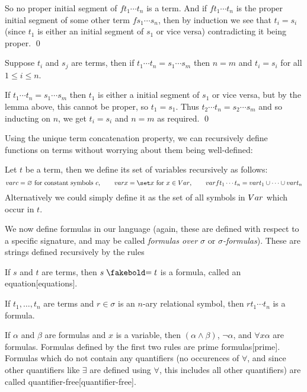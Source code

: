 So no proper initial segment of $ft_1\cdots t_n$ is a term.
And if $ft_1\cdots t_n$ is the proper initial segment of some other term $fs_1\cdots s_n$, then by induction we see that $t_i=s_i$ (since $t_1$ is either an initial segment of $s_1$ or vice versa)
contradicting it being proper.
\qed

\bprop[title=Unique Term Concatenation Property, name=uniquetermcat]

    Suppose $t_i$ and $s_j$ are terms, then if $t_1\cdots t_n=s_1\cdots s_m$ then $n=m$ and $t_i=s_i$ for all $1\leq i\leq n$.

\eprop

If $t_1\cdots t_n=s_1\cdots s_m$ then $t_1$ is either a initial segment of $s_1$ or vice versa, but by the lemma above, this cannot be proper, so $t_1=s_1$.
Thus $t_2\cdots t_n=s_2\cdots s_m$ and so inducting on $n$, we get $t_i=s_i$ and $n=m$ as required.
\qed

Using the unique term concatenation property, we can recursively define functions on terms without worrying about them being well-defined:

\bdefn

    Let $t$ be a term, then we define its {\emphcolor set of variables} recursively as follows:
    $$ \var c=\varnothing\hbox{ for constant symbols $c$},\qquad \var x=\set x\hbox{ for $x\in\Var$},\qquad \var ft_1\cdots t_n=\var t_1\cup\cdots\cup\var t_n $$
    Alternatively we could simply define it as the set of all symbols in ${\sl Var}$ which occur in $t$.

\edefn

\bdefn

    We now define {\emphcolor formulas} in our language (again, these are defined with respect to a specific signature, and may be called {\it formulas over $\sigma$} or
    {\it $\sigma$-formulas}).
    These are strings defined recursively by the rules
    \benum
        \item If $s$ and $t$ are terms, then $s\eq t$ is a formula, called an {\emphcolor equation}[equations].
        \item If $t_1,\dots,t_n$ are terms and $r\in\sigma$ is an $n$-ary relational symbol, then $rt_1\cdots t_n$ is a formula.
        \item If $\alpha$ and $\beta$ are formulas and $x$ is a variable, then $(\alpha\land\beta)$, $\neg\alpha$, and $\forall x\alpha$ are formulas.
    \eenum
    Formulas defined by the first two rules are {\emphcolor prime formulas}[prime].
    Formulas which do not contain any quantifiers (no occurences of $\forall$, and since other quantifiers like $\exists$ are defined using $\forall$, this includes all other quantifiers) are called
    {\emphcolor quantifier-free}[quantifier-free].

